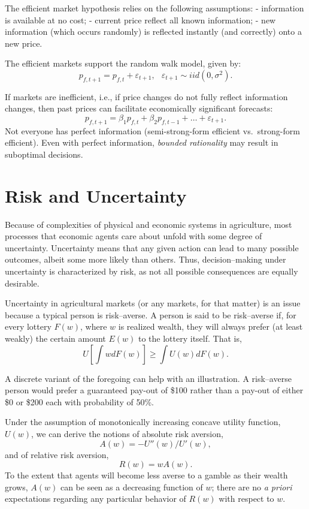 \documentclass[
]{book}
\begin{document}
The efficient market hypothesis relies on the following assumptions:
- information is available at no cost;
- current price reflect all known information;
- new information (which occurs randomly) is reflected instantly (and correctly) onto a new price.

The efficient markets support the random walk model, given by: \[p_{f,t+1} = p_{f,t} + \varepsilon_{t+1},\;~~\varepsilon_{t+1}\sim iid\left(0,\sigma^2\right).\]

If markets are inefficient, i.e., if price changes do not fully reflect information changes, then past prices can facilitate economically significant forecasts: \[p_{f,t+1} = \beta_1 p_{f,t} + \beta_2 p_{f,t-1} + \ldots + \varepsilon_{t+1}.\] Not everyone has perfect information (semi-strong-form efficient vs.~strong-form efficient). Even with perfect information, \emph{bounded rationality} may result in suboptimal decisions.

\hypertarget{risk-and-uncertainty}{%
\chapter{Risk and Uncertainty}\label{risk-and-uncertainty}}

Because of complexities of physical and economic systems in agriculture, most processes that economic agents care about unfold with some degree of uncertainty. Uncertainty means that any given action can lead to many possible outcomes, albeit some more likely than others. Thus, decision--making under uncertainty is characterized by risk, as not all possible consequences are equally desirable.

Uncertainty in agricultural markets (or any markets, for that matter) is an issue because a typical person is risk--averse. A person is said to be risk--averse if, for every lottery \(F(w)\), where \(w\) is realized wealth, they will always prefer (at least weakly) the certain amount \(E(w)\) to the lottery itself. That is, \[U\left[\int w dF(w)\right] \ge \int U(w)dF(w).\]

A discrete variant of the foregoing can help with an illustration. A risk--averse person would prefer a guaranteed pay-out of \$100 rather than a pay-out of either \$0 or \$200 each with probability of 50\%.

Under the assumption of monotonically increasing concave utility function, \(U(w)\), we can derive the notions of absolute risk aversion, \[A(w) = -U''(w)/U'(w),\] and of relative risk aversion, \[R(w) = wA(w).\] To the extent that agents will become less averse to a gamble as their wealth grows, \(A(w)\) can be seen as a decreasing function of \(w\); there are no \emph{a priori} expectations regarding any particular behavior of \(R(w)\) with respect to \(w\).
\end{document}
